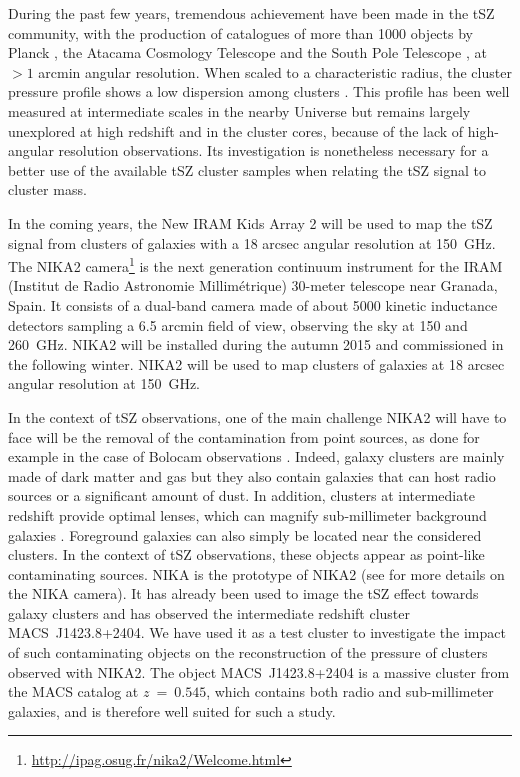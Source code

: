 \documentclass[twocolumn,traditabstract]{aa}
\begin{document}
During the past few years, tremendous achievement have been made in the tSZ community, with the production of catalogues of more than 1000 objects by Planck \citep{planck2013catalogue}, the Atacama Cosmology Telescope \citep[ACT,][]{hasselfield2013} and the South Pole Telescope \citep[SPT,][]{reichardt2013,bleem2014}, at $>1$ arcmin angular resolution. When scaled to a characteristic radius, the cluster pressure profile shows a low dispersion among clusters \citep{arnaud2010}. This profile has been well measured at intermediate scales in the nearby Universe \citep{planck2013pressure_profile,sayers2013b} but remains largely unexplored at high redshift and in the cluster cores, because of the lack of high-angular resolution observations. Its investigation is nonetheless necessary for a better use of the available tSZ cluster samples when relating the tSZ signal to cluster mass.

In the coming years, the New IRAM Kids Array 2 \citep[NIKA2][]{monfardini2014} will be used to map the tSZ signal from clusters of galaxies with a 18 arcsec angular resolution at 150~GHz. The NIKA2 camera\footnote{\url{http://ipag.osug.fr/nika2/Welcome.html}} is the next generation continuum instrument for the IRAM (Institut de Radio Astronomie Millim\'etrique) 30-meter telescope near Granada, Spain. It consists of a dual-band camera made of about 5000 kinetic inductance detectors sampling a 6.5 arcmin field of view, observing the sky at 150 and 260~GHz. NIKA2 will be installed during the autumn 2015 and commissioned in the following winter. NIKA2 will be used to map clusters of galaxies at 18 arcsec angular resolution at 150~GHz. 

In the context of tSZ observations, one of the main challenge NIKA2 will have to face will be the removal of the contamination from point sources, as done for example in the case of Bolocam observations \citep{sayers2013a}. Indeed, galaxy clusters are mainly made of dark matter and gas but they also contain galaxies that can host radio sources or a significant amount of dust. In addition, clusters at intermediate redshift provide optimal lenses, which can magnify sub-millimeter background galaxies \citep[see e.g.][]{adam2014}. Foreground galaxies can also simply be located near the considered clusters. In the context of tSZ observations, these objects appear as point-like contaminating sources. NIKA is the prototype of NIKA2 (see \cite{monfardini2010,bourion2011,bourrion2012,monfardini2011,calvo2012,catalano2014} for more details on the NIKA camera). It has already been used to image the tSZ effect towards galaxy clusters \citep[\mbox{RX~J1347.5-1145} and \mbox{CL~J1226.9+3332}, see][]{adam2013,adam2014} and has observed the intermediate redshift cluster \mbox{MACS~J1423.8+2404}. We have used it as a test cluster to investigate the impact of such contaminating objects on the reconstruction of the pressure of clusters observed with NIKA2. The object \mbox{MACS~J1423.8+2404} is a massive cluster from the MACS catalog \citep[Massive Cluster Survey,][]{ebeling2001} at $z~=~0.545$, which contains both radio and sub-millimeter galaxies, and is therefore well suited for such a study. 
\end{document}

